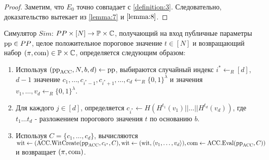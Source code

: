 \begin{proof}
	Заметим, что $E_0$ точно совпадает с \ref{definition:3}.
	Следовательно, доказательство вытекает из \ref{lemma:7} и $\ref{lemma:8}$.
\end{proof}

\begin{definition}[Симулятор]
	Симулятор $Sim$: $PP \times [N] \rightarrow \mathbb{P} \times \mathbb{C}$, получающий на вход публичные параметры $\text{pp} \in PP$, целое положительное пороговое значение $t \in [N]$ и возвращающий набор $(\pi, \text{com}) \in \mathbb{P} \times \mathbb{C}$, определяется следующим образом:
	\begin{enumerate}
		\item Используя $(\text{pp}_{\text{ACC}}, N, b, d) \leftarrow \text{pp}$, выбираются случайный индекс $i^* \leftarrow_R [d]$, $d - 1$ значение $c_1, \dots, c_{i^* - 1}, c_{i^* + 1}, \dots, c_d \leftarrow_R \{0, 1\}^\lambda$ и значения $v_1, \dots, v_d \leftarrow_R \{0, 1\}^\lambda$.
		\item Для каждого $j \in [d]$, определяется $c_{i^*} \leftarrow H(H^{t_1}(v_1) || \dots || H^{t_d}(v_d))$, где $t_1 \dots t_d$ - разложением порогового значения $t$ по основанию $b$.
		\item Используя $C = \{c_1, \dots, c_d\}$, вычисляются $\text{wit} \leftarrow (\text{ACC}.\text{WitCreate}(\text{pp}_{\text{ACC}}, c_{i^*}, C), \text{wit} \leftarrow (\text{wit}, \langle v_1, \dots, v_d \rangle), \text{com} \leftarrow \text{ACC}.\text{Eval}(\text{pp}_{\text{ACC}}, C))$ и возвращает $(\pi, \text{com})$.
	\end{enumerate}
\end{definition}

